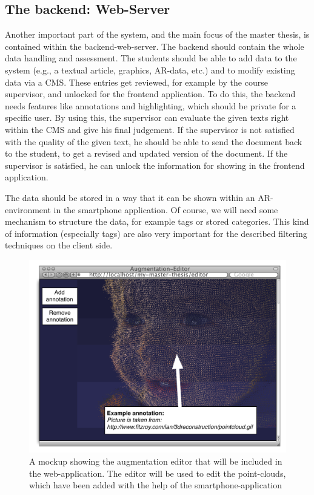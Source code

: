 \documentclass[a4page]{article}
\begin{document}
\subsection{The backend: Web-Server} 
Another important part of the system, and the main focus of the master thesis, is contained within the backend-web-server. The backend should contain the whole data handling and assessment. The students should be able to add data to the system (e.g., a textual article, graphics, \ac{AR}-data, etc.) and to modify existing data via a \ac{CMS}. These entries get reviewed, for example by the course supervisor, and unlocked for the frontend application. To do this, the backend needs features like annotations and highlighting, which should be private for a specific user. By using this, the supervisor can evaluate the given texts right within the \ac{CMS} and give his final judgement. If the supervisor is not satisfied with the quality of the given text, he should be able to send the document back to the student, to get a revised and updated version of the document. If the supervisor is satisfied, he can unlock the information for showing in the frontend application.

The data should be stored in a way that it can be shown within an \ac{AR}-environment in the smartphone application. Of course, we will need some mechanism to structure the data, for example tags or stored categories. This kind of information (especially tags) are also very important for the described filtering techniques on the client side.

\begin{figure}[th]
\centerline{\includegraphics[width=1\textwidth]{gfx/mockup_web_1}}
\caption{A mockup showing the augmentation editor that will be included in the web-application. The editor will be used to edit the point-clouds, which have been added with the help of the smartphone-application}
\label{web1}
\end{figure}
\end{document}
